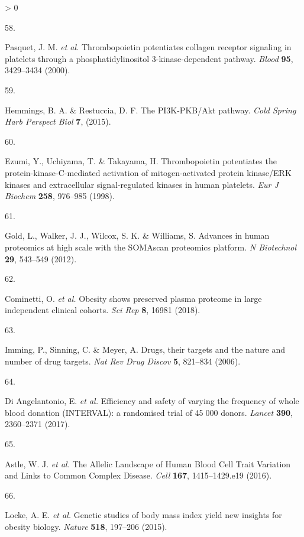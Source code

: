 \documentclass[11pt,twoside]{bristolthesis}
\newlength{\cslhangindent}
\newlength{\csllabelwidth}
\newenvironment{CSLReferences}[2] %
 {%
  \setlength{\parindent}{0pt}
  \ifodd #1 \everypar{\setlength{\hangindent}{\cslhangindent}}\ignorespaces\fi
  \ifnum #2 > 0
  \setlength{\parskip}{#2\baselineskip}
  \fi
 }%
 {}
\newcommand{\CSLLeftMargin}[1]{\parbox[t]{\csllabelwidth}{#1}}
\newcommand{\CSLRightInline}[1]{\parbox[t]{\linewidth - \csllabelwidth}{#1}\break}
\begin{document}
\begin{CSLReferences}{0}{0}
\leavevmode\hypertarget{ref-Pasquet2000}{}%
\CSLLeftMargin{58. }
\CSLRightInline{Pasquet, J. M. \emph{et al.} {Thrombopoietin potentiates collagen receptor signaling in platelets through a phosphatidylinositol 3-kinase-dependent pathway}. \emph{Blood} \textbf{95}, 3429--3434 (2000).}

\leavevmode\hypertarget{ref-Hemmings2015}{}%
\CSLLeftMargin{59. }
\CSLRightInline{Hemmings, B. A. \& Restuccia, D. F. {The PI3K-PKB/Akt pathway}. \emph{Cold Spring Harb Perspect Biol} \textbf{7}, (2015).}

\leavevmode\hypertarget{ref-Ezumi1998}{}%
\CSLLeftMargin{60. }
\CSLRightInline{Ezumi, Y., Uchiyama, T. \& Takayama, H. {Thrombopoietin potentiates the protein-kinase-C-mediated activation of mitogen-activated protein kinase/ERK kinases and extracellular signal-regulated kinases in human platelets}. \emph{Eur J Biochem} \textbf{258}, 976--985 (1998).}

\leavevmode\hypertarget{ref-Gold2012}{}%
\CSLLeftMargin{61. }
\CSLRightInline{Gold, L., Walker, J. J., Wilcox, S. K. \& Williams, S. {Advances in human proteomics at high scale with the SOMAscan proteomics platform}. \emph{N Biotechnol} \textbf{29}, 543--549 (2012).}

\leavevmode\hypertarget{ref-Cominetti2018}{}%
\CSLLeftMargin{62. }
\CSLRightInline{Cominetti, O. \emph{et al.} {Obesity shows preserved plasma proteome in large independent clinical cohorts}. \emph{Sci Rep} \textbf{8}, 16981 (2018).}

\leavevmode\hypertarget{ref-Imming2006}{}%
\CSLLeftMargin{63. }
\CSLRightInline{Imming, P., Sinning, C. \& Meyer, A. {Drugs, their targets and the nature and number of drug targets}. \emph{Nat Rev Drug Discov} \textbf{5}, 821--834 (2006).}

\leavevmode\hypertarget{ref-DiAngelantonio2017}{}%
\CSLLeftMargin{64. }
\CSLRightInline{Di Angelantonio, E. \emph{et al.} {Efficiency and safety of varying the frequency of whole blood donation (INTERVAL): a randomised trial of 45 000 donors}. \emph{Lancet} \textbf{390}, 2360--2371 (2017).}

\leavevmode\hypertarget{ref-Astle2016}{}%
\CSLLeftMargin{65. }
\CSLRightInline{Astle, W. J. \emph{et al.} {The Allelic Landscape of Human Blood Cell Trait Variation and Links to Common Complex Disease}. \emph{Cell} \textbf{167}, 1415--1429.e19 (2016).}

\leavevmode\hypertarget{ref-Locke2015}{}%
\CSLLeftMargin{66. }
\CSLRightInline{Locke, A. E. \emph{et al.} {Genetic studies of body mass index yield new insights for obesity biology}. \emph{Nature} \textbf{518}, 197--206 (2015).}


\end{CSLReferences}
\end{document}
